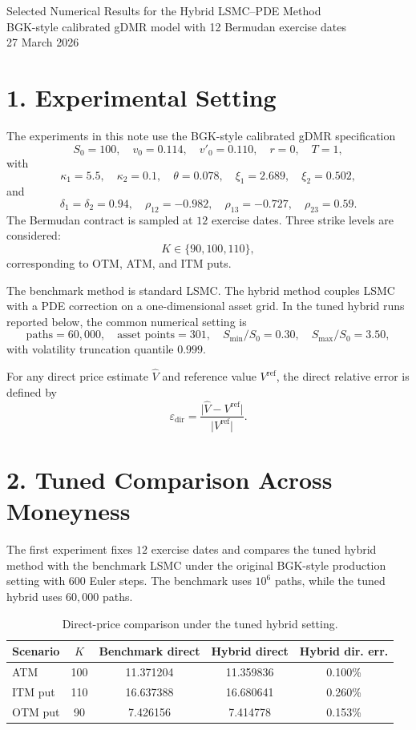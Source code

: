 \documentclass[11pt,a4paper]{article}
\begin{document}
\begin{center}
{\Large Selected Numerical Results for the Hybrid LSMC--PDE Method}\\[0.5em]
{\normalsize BGK-style calibrated gDMR model with 12 Bermudan exercise dates}\\[0.5em]
{\normalsize 27 March 2026}
\end{center}

\section*{1. Experimental Setting}

The experiments in this note use the BGK-style calibrated gDMR specification
\[
S_0 = 100,\quad v_0 = 0.114,\quad v'_0 = 0.110,\quad r = 0,\quad T = 1,
\]
with
\[
\kappa_1 = 5.5,\quad \kappa_2 = 0.1,\quad \theta = 0.078,\quad \xi_1 = 2.689,\quad \xi_2 = 0.502,
\]
and
\[
\delta_1 = \delta_2 = 0.94,\quad \rho_{12} = -0.982,\quad \rho_{13} = -0.727,\quad \rho_{23} = 0.59.
\]
The Bermudan contract is sampled at \(12\) exercise dates. Three strike levels are considered:
\[
K \in \{90, 100, 110\},
\]
corresponding to OTM, ATM, and ITM puts.

The benchmark method is standard LSMC. The hybrid method couples LSMC with a PDE correction on a one-dimensional asset grid. In the tuned hybrid runs reported below, the common numerical setting is
\[
\text{paths} = 60{,}000,\quad \text{asset points} = 301,\quad
S_{\min}/S_0 = 0.30,\quad S_{\max}/S_0 = 3.50,
\]
with volatility truncation quantile \(0.999\).

For any direct price estimate \(\widehat{V}\) and reference value \(V^{\mathrm{ref}}\), the direct relative error is defined by
\[
\varepsilon_{\mathrm{dir}} = \frac{\lvert \widehat{V} - V^{\mathrm{ref}} \rvert}{\lvert V^{\mathrm{ref}} \rvert}.
\]

\section*{2. Tuned Comparison Across Moneyness}

The first experiment fixes \(12\) exercise dates and compares the tuned hybrid method with the benchmark LSMC under the original BGK-style production setting with \(600\) Euler steps. The benchmark uses \(10^6\) paths, while the tuned hybrid uses \(60{,}000\) paths.

\begin{table}[h!]
\centering
\caption{Direct-price comparison under the tuned hybrid setting.}
\begin{tabular}{lcccc}
\toprule
Scenario & \(K\) & Benchmark direct & Hybrid direct & Hybrid dir. err. \\
\midrule
ATM & 100 & 11.371204 & 11.359836 & 0.100\% \\
ITM put & 110 & 16.637388 & 16.680641 & 0.260\% \\
OTM put & 90 & 7.426156 & 7.414778 & 0.153\% \\
\bottomrule
\end{tabular}
\end{table}
\end{document}
